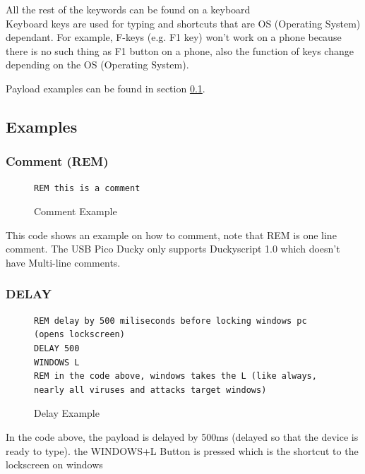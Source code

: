 \documentclass[a4paper,12pt]{article}
\begin{document}
All the rest of the keywords can be found on a keyboard\\

Keyboard keys are used for typing and shortcuts that are OS (Operating System) dependant. For example, F-keys (e.g. F1 key) won't work on a phone because there is no such thing as F1 button on a phone, also the function of keys change depending on the OS (Operating System).

Payload examples can be found in section \ref{duckyscript_examples}.

\subsection{Examples}\label{duckyscript_examples}

\subsubsection{Comment (REM)}

\begin{figure}[htb]
\begin{small}
\begin{lstlisting}[language=Ducky]
REM this is a comment
\end{lstlisting}
\end{small}
\caption{Comment Example}
\end{figure}

This code shows an example on how to comment, note that REM is one line comment. The USB Pico Ducky only supports Duckyscript 1.0 which doesn't have Multi-line comments.

\subsubsection{DELAY}

\begin{figure}[htb]
\begin{small}
\begin{lstlisting}[language=Ducky]
REM delay by 500 miliseconds before locking windows pc (opens lockscreen)
DELAY 500
WINDOWS L
REM in the code above, windows takes the L (like always, nearly all viruses and attacks target windows)
\end{lstlisting}
\end{small}
\caption{Delay Example}
\end{figure}

In the code above, the payload is delayed by 500ms (delayed so that the device is ready to type). the WINDOWS+L Button is pressed which is the shortcut to the lockscreen on windows
\end{document}
